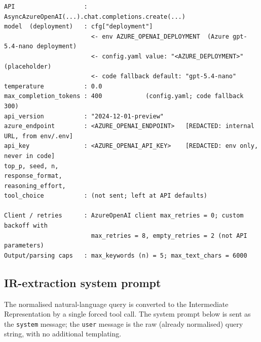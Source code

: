 \begin{lstlisting}
API                   : AsyncAzureOpenAI(...).chat.completions.create(...)
model  (deployment)   : cfg["deployment"]
                        <- env AZURE_OPENAI_DEPLOYMENT  (Azure gpt-5.4-nano deployment)
                        <- config.yaml value: "<AZURE_DEPLOYMENT>"  (placeholder)
                        <- code fallback default: "gpt-5.4-nano"
temperature           : 0.0
max_completion_tokens : 400            (config.yaml; code fallback 300)
api_version           : "2024-12-01-preview"
azure_endpoint        : <AZURE_OPENAI_ENDPOINT>   [REDACTED: internal URL, from env/.env]
api_key               : <AZURE_OPENAI_API_KEY>    [REDACTED: env only, never in code]
top_p, seed, n,
response_format,
reasoning_effort,
tool_choice           : (not sent; left at API defaults)

Client / retries      : AzureOpenAI client max_retries = 0; custom backoff with
                        max_retries = 8, empty_retries = 2 (not API parameters)
Output/parsing caps   : max_keywords (n) = 5; max_text_chars = 6000
\end{lstlisting}

\subsection*{IR-extraction system prompt}

The normalised natural-language query is converted to the Intermediate
Representation by a single forced tool call. The system prompt below is sent as
the \texttt{system} message; the \texttt{user} message is the raw (already
normalised) query string, with no additional templating.


